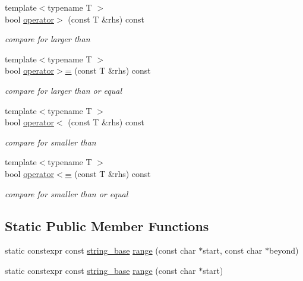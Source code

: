 \begin{DoxyCompactItemize}
\mbox{\label{classhwlib_1_1string__base_a9e39abf38638d56372cd9fe8eaebeea1}} 
{\footnotesize template$<$typename T $>$ }\\bool \hyperlink{classhwlib_1_1string__base_a9e39abf38638d56372cd9fe8eaebeea1}{operator$>$} (const T \&rhs) const
\begin{DoxyCompactList}\small\item\em compare for larger than \end{DoxyCompactList}\item 
\mbox{\label{classhwlib_1_1string__base_a144d0cf66663576357129f692656d4b8}} 
{\footnotesize template$<$typename T $>$ }\\bool \hyperlink{classhwlib_1_1string__base_a144d0cf66663576357129f692656d4b8}{operator$>$=} (const T \&rhs) const
\begin{DoxyCompactList}\small\item\em compare for larger than or equal \end{DoxyCompactList}\item 
\mbox{\label{classhwlib_1_1string__base_ad3d373aef518b17dc66c9367e68b54fb}} 
{\footnotesize template$<$typename T $>$ }\\bool \hyperlink{classhwlib_1_1string__base_ad3d373aef518b17dc66c9367e68b54fb}{operator$<$} (const T \&rhs) const
\begin{DoxyCompactList}\small\item\em compare for smaller than \end{DoxyCompactList}\item 
\mbox{\label{classhwlib_1_1string__base_a16b4e0d5dd83471df58eebbcea68a2aa}} 
{\footnotesize template$<$typename T $>$ }\\bool \hyperlink{classhwlib_1_1string__base_a16b4e0d5dd83471df58eebbcea68a2aa}{operator$<$=} (const T \&rhs) const
\begin{DoxyCompactList}\small\item\em compare for smaller than or equal \end{DoxyCompactList}\end{DoxyCompactItemize}
\subsection*{Static Public Member Functions}
\begin{DoxyCompactItemize}
\item 
static constexpr const \hyperlink{classhwlib_1_1string__base}{string\+\_\+base} \hyperlink{classhwlib_1_1string__base_ab7e08e38e685b9e5b1f428a2f06a8351}{range} (const char $\ast$start, const char $\ast$beyond)
\item 
static constexpr const \hyperlink{classhwlib_1_1string__base}{string\+\_\+base} \hyperlink{classhwlib_1_1string__base_adb2c31933447980f725dde41638cb068}{range} (const char $\ast$start)
\end{DoxyCompactItemize}

